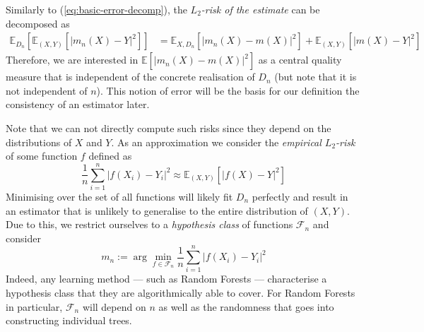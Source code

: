 \documentclass[10pt]{article}
\theoremstyle{definition}
\begin{document}
Similarly to (\ref{eq:basic-error-decomp}), the \textit{\(L_2\)-risk of the
  estimate}  can be decomposed as
\begin{align}
  \label{eq:basic-error-decomp2}
  \mathbb{E}_{D_n} \left[
    \mathbb{E}_{(X,Y)}\left[|m_{n}(X) - Y|^2 \right]
  \right] 
  &= \mathbb{E}_{X, D_n}\left[|m_{n}(X) - m(X)|^2\right]
  + \mathbb{E}_{(X,Y)}\left[|m(X)-Y|^2\right]
\end{align}
Therefore,
we are interested in 
\(\mathbb{E}\left[|m_{n}(X)- m(X)|^2\right]\)
as a central quality measure that is independent of the concrete realisation of
$D_n$ (but note that it is not independent of $n$). This notion of error will be the basis for our definition
the consistency of an estimator later.

Note that we can not directly compute such risks since they
depend on the distributions of \(X\) and \(Y\). As an approximation we
consider the \emph{empirical \(L_{2}\)-risk} of some function \(f\) defined as
\[
  \frac{1}{n} \sum_{i=1}^n |f(X_{i}) - Y_{i}|^2
  \approx 
\mathbb{E}_{(X,Y)}\left[|f(X) - Y|^2\right] 
\]
Minimising over the set of all functions
will likely fit \(D_{n}\) perfectly and result in an estimator that is unlikely to
generalise to the entire distribution of \((X, Y)\). Due to this, we
restrict ourselves to a \emph{hypothesis class} of functions
\(\mathcal{F}_{n}\) and consider \[
m_{n} 
:= 
\arg\min_{f \in \mathcal{F}_{n}}
\frac{1}{n} \sum_{i=1}^n |f(X_{i}) - Y_{i}|^2
\] Indeed, any learning method --- such as Random Forests ---
characterise a hypothesis class that they are algorithmically able to
cover. For Random Forests in particular, \(\mathcal{F}_{n}\) will depend
on \(n\) as well as the randomness that goes into constructing
individual trees.
\end{document}
